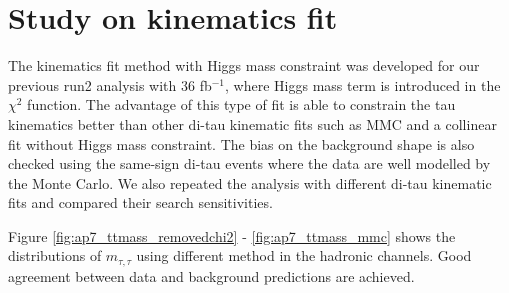 \section{Study on kinematics fit}
\label{sec:kine}

The kinematics fit method with Higgs mass constraint was developed for our previous run2 analysis with 36 fb$^{-1}$, where Higgs mass term is introduced
in the $\chi^2$ function. The advantage of this type of fit is able to constrain the tau kinematics better than other di-tau kinematic fits such as MMC and
a collinear fit without Higgs mass constraint. The bias on the background shape is also checked using the same-sign di-tau events where the data are well modelled
by the Monte Carlo. We also repeated the analysis with different di-tau kinematic fits and compared their search sensitivities.

Figure \ref{fig:ap7_ttmass_removedchi2} - \ref{fig:ap7_ttmass_mmc} shows the distributions of $m_{\tau,\tau}$ using different method in the hadronic channels. Good agreement between data and background predictions are achieved.




